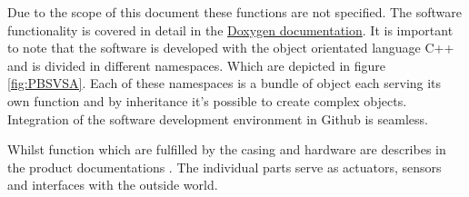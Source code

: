 \documentclass[fleqn,10pt]{SelfArx} %
\begin{document}
Due to the scope of this document these functions are not specified. The software functionality is covered in detail in the \href{http://peer23peer.github.io/VisionSoilAnalyzer/Doxygen/html/index.html}{\color{color1}Doxygen documentation}. It is important to note that the software is developed with the object orientated language C++ and is divided in different namespaces. Which are depicted in figure \ref{fig:PBSVSA}. Each of these namespaces is a bundle of object each serving its own function and by inheritance it's possible to create complex objects. Integration of the software development environment in Github is seamless.

Whilst function which are fulfilled by the casing and hardware are describes in the product documentations \cite{jelle_spijker_vision_2015}. The individual parts serve as actuators, sensors and interfaces with the outside world.  
\end{document}
